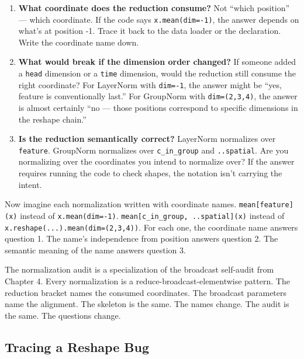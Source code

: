 \documentclass[11pt,titlepage]{article}
\begin{document}
\begin{enumerate}
\def\labelenumi{\arabic{enumi}.}
\item
  \textbf{What coordinate does the reduction consume?} Not ``which
  position'' --- which coordinate. If the code says
  \texttt{x.mean(dim=-1)}, the answer depends on what's at position -1.
  Trace it back to the data loader or the declaration. Write the
  coordinate name down.
\item
  \textbf{What would break if the dimension order changed?} If someone
  added a \texttt{head} dimension or a \texttt{time} dimension, would
  the reduction still consume the right coordinate? For LayerNorm with
  \texttt{dim=-1}, the answer might be ``yes, feature is conventionally
  last.'' For GroupNorm with \texttt{dim=(2,3,4)}, the answer is almost
  certainly ``no --- those positions correspond to specific dimensions
  in the reshape chain.''
\item
  \textbf{Is the reduction semantically correct?} LayerNorm normalizes
  over \texttt{feature}. GroupNorm normalizes over \texttt{c\_in\_group}
  and \texttt{..spatial}. Are you normalizing over the coordinates you
  intend to normalize over? If the answer requires running the code to
  check shapes, the notation isn't carrying the intent.
\end{enumerate}

Now imagine each normalization written with coordinate names.
\texttt{mean{[}feature{]}(x)} instead of \texttt{x.mean(dim=-1)}.
\texttt{mean{[}c\_in\_group,\ ..spatial{]}(x)} instead of
\texttt{x.reshape(...).mean(dim=(2,3,4))}. For each one, the coordinate
name answers question 1. The name's independence from position answers
question 2. The semantic meaning of the name answers question 3.

The normalization audit is a specialization of the broadcast self-audit
from Chapter 4. Every normalization is a reduce-broadcast-elementwise
pattern. The reduction bracket names the consumed coordinates. The
broadcast parameters name the alignment. The skeleton is the same. The
names change. The audit is the same. The questions change.

\vspace{2em}

\hypertarget{tracing-a-reshape-bug}{%
\subsection{Tracing a Reshape Bug}\label{tracing-a-reshape-bug}}
\end{document}
